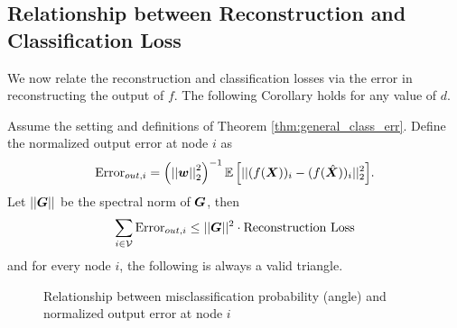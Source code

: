 \subsection{Relationship between Reconstruction and Classification Loss}
We now relate the reconstruction and classification losses via the error in reconstructing the output of $f$. The following Corollary holds for any value of $d$.

\begin{corollary}
\label{corr:relationship}
    Assume the setting and definitions of Theorem \ref{thm:general_class_err}. 
    Define the normalized output error at node $i$ as 
    \begin{equation}
    \text{Error}_{out, i} = \left(\sqnormvec{\vect{w}}\right)^{-1}{\expect{||(f(\matr{X}))_i - (f(\hat{\matr{X}}))_i||^{2}_{2}}}. 
    \end{equation}
Let $||\bm{G}||$ be the spectral norm of $\bm{G}$, then
\begin{equation}
\label{eq:bound_final_layer}
\sum_{i \in \mathcal{V}} \text{Error}_{out,i} \leq ||\bm{G}||^{2} \cdot \text{Reconstruction Loss}
\end{equation}
and for every node $i$, the following is always a valid triangle.
\begin{figure}[H]
    \centering
    
    \caption{Relationship between misclassification probability (angle) and normalized output error at node $i$}
    \label{fig:class_rec_rel_fig}
\end{figure}

\end{corollary}
